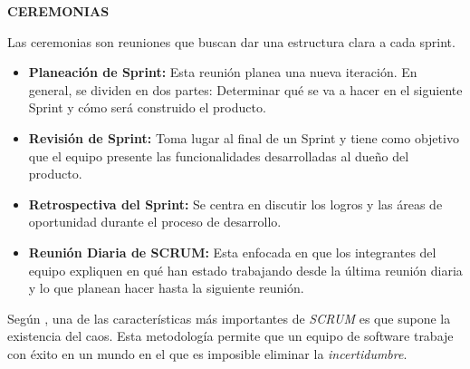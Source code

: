 \textbf{CEREMONIAS}

Las ceremonias son reuniones que buscan dar una estructura clara a cada sprint.

\begin{itemize}
    \item \textbf{Planeación de Sprint: } Esta reunión planea una nueva iteración. En general, se dividen en dos partes: Determinar qué se va a hacer en el siguiente Sprint y cómo será construido el producto.
    \item \textbf{Revisión de Sprint: } Toma lugar al final de un Sprint y tiene como objetivo que el equipo presente las funcionalidades desarrolladas al dueño del producto.
    \item \textbf{Retrospectiva del Sprint: } Se centra en discutir los logros y las áreas de oportunidad durante el proceso de desarrollo.
    \item \textbf{Reunión Diaria de SCRUM: } Esta enfocada en que los integrantes del equipo expliquen en qué han estado trabajando desde la última reunión diaria y lo que planean hacer hasta la siguiente reunión.
\end{itemize}

Según \parencite{pressman2010ingenieria}, una de las características más importantes de \textit{SCRUM} es que supone la existencia del caos. Esta metodología permite que un equipo de software trabaje con éxito en un mundo en el que es imposible eliminar la \textit{incertidumbre}.







